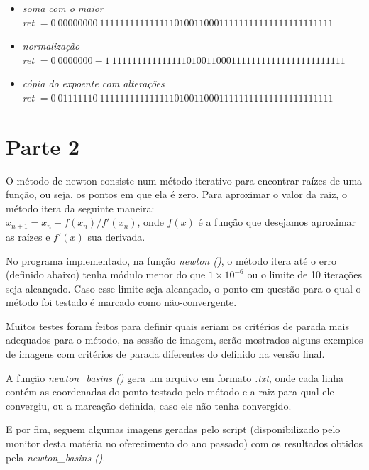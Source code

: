 \documentclass{article}
\begin{document}
\begin{itemize}
\begin{itemize}
    \item \textit{soma com o maior} \\
    \textit{ret} $= {0}\ {00000000}\ {11111111111111101001100011111111111111111111111}$ \\

    \item \textit{normalização} \\
    \textit{ret} $= {0}\ {0000000-1}\ {11111111111111101001100011111111111111111111111}$ \\
    
    \item \textit{cópia do expoente com alterações} \\
    \textit{ret} $= {0}\ {01111110}\ {11111111111111101001100011111111111111111111111}$ \\
    \end{itemize}
\end{itemize}

\begin{flushleft}

\end{flushleft}

\section*{Parte 2}
O método de newton consiste num método iterativo para encontrar raízes de uma função, ou seja,
os pontos em que ela é zero. Para aproximar o valor da raiz, o método itera da seguinte maneira: \\
$x_{n+1} = x_{n} - f(x_{n})/f'(x_{n})$, onde $f(x)$ é a função que desejamos aproximar as
raízes e $f'(x)$ sua derivada.

No programa implementado, na função \textit{newton ()}, o método itera até o erro (definido abaixo) 
tenha módulo menor do que $1 \times 10^{-6}$ ou o limite de 10 iterações seja alcançado. Caso esse limite seja alcançado,
o ponto em questão para o qual o método foi testado é marcado como não-convergente.

Muitos testes foram feitos para definir quais seriam os critérios de parada mais adequados para o método,
na sessão de imagem, serão mostrados alguns exemplos de imagens com critérios de parada diferentes do definido na versão final. 

A função \textit{newton\_basins ()} gera um arquivo em formato \textit{.txt}, onde cada linha contém as coordenadas 
do ponto testado pelo método e a raiz para qual ele convergiu, ou a marcação definida, caso ele não tenha
convergido.


E por fim, seguem algumas imagens geradas pelo script (disponibilizado pelo
monitor desta matéria no oferecimento do ano passado) com os resultados obtidos
pela \textit{newton\_basins ()}.


\end{document}
